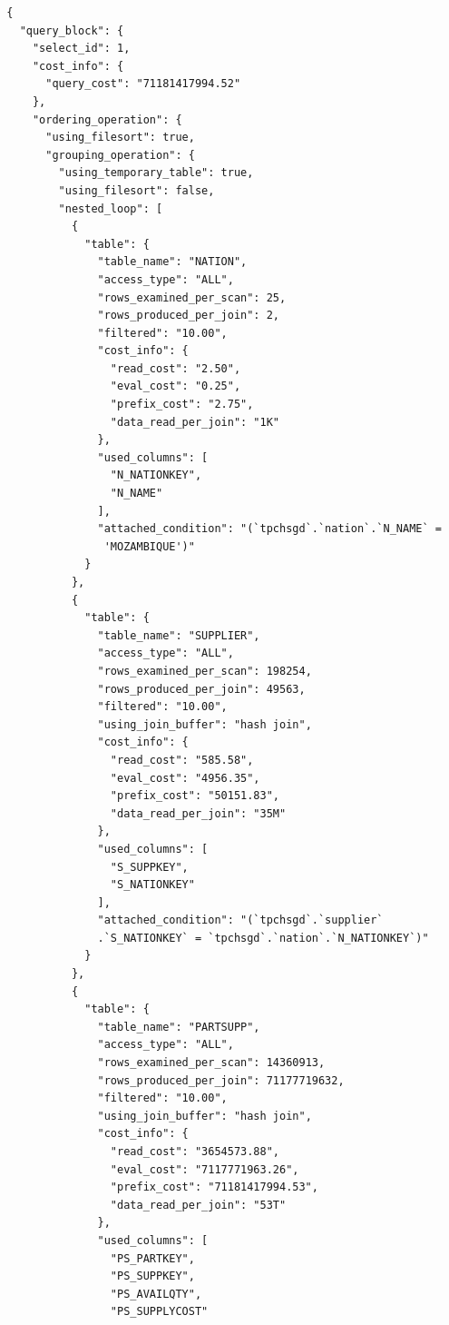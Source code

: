 \documentclass{article}
\begin{document}
\begin{lstlisting}
  {
    "query_block": {
      "select_id": 1,
      "cost_info": {
        "query_cost": "71181417994.52"
      },
      "ordering_operation": {
        "using_filesort": true,
        "grouping_operation": {
          "using_temporary_table": true,
          "using_filesort": false,
          "nested_loop": [
            {
              "table": {
                "table_name": "NATION",
                "access_type": "ALL",
                "rows_examined_per_scan": 25,
                "rows_produced_per_join": 2,
                "filtered": "10.00",
                "cost_info": {
                  "read_cost": "2.50",
                  "eval_cost": "0.25",
                  "prefix_cost": "2.75",
                  "data_read_per_join": "1K"
                },
                "used_columns": [
                  "N_NATIONKEY",
                  "N_NAME"
                ],
                "attached_condition": "(`tpchsgd`.`nation`.`N_NAME` =
                 'MOZAMBIQUE')"
              }
            },
            {
              "table": {
                "table_name": "SUPPLIER",
                "access_type": "ALL",
                "rows_examined_per_scan": 198254,
                "rows_produced_per_join": 49563,
                "filtered": "10.00",
                "using_join_buffer": "hash join",
                "cost_info": {
                  "read_cost": "585.58",
                  "eval_cost": "4956.35",
                  "prefix_cost": "50151.83",
                  "data_read_per_join": "35M"
                },
                "used_columns": [
                  "S_SUPPKEY",
                  "S_NATIONKEY"
                ],
                "attached_condition": "(`tpchsgd`.`supplier`
                .`S_NATIONKEY` = `tpchsgd`.`nation`.`N_NATIONKEY`)"
              }
            },
            {
              "table": {
                "table_name": "PARTSUPP",
                "access_type": "ALL",
                "rows_examined_per_scan": 14360913,
                "rows_produced_per_join": 71177719632,
                "filtered": "10.00",
                "using_join_buffer": "hash join",
                "cost_info": {
                  "read_cost": "3654573.88",
                  "eval_cost": "7117771963.26",
                  "prefix_cost": "71181417994.53",
                  "data_read_per_join": "53T"
                },
                "used_columns": [
                  "PS_PARTKEY",
                  "PS_SUPPKEY",
                  "PS_AVAILQTY",
                  "PS_SUPPLYCOST"

\end{lstlisting}
\end{document}
